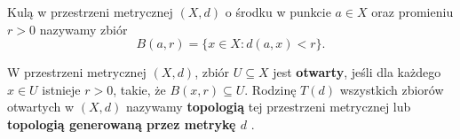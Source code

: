 \begin{definition}[Kula]
	Kulą w przestrzeni metrycznej $\left( X,d \right) $ o środku w punkcie $a\in X$ oraz promieniu $r > 0$ nazywamy zbiór
	\[
	B\left( a,r \right) = \{x \in X : d\left( a,x \right) < r\} 
	.\] 
\end{definition} 
\begin{definition}
	W przestrzeni metrycznej $\left( X,d \right) $, zbiór $U \subseteq X$ jest \textbf{otwarty}, jeśli dla każdego $x \in U$ istnieje $r>0$, takie, że $B\left( x,r \right) \subseteq U$. Rodzinę $T\left( d \right) $ wszystkich zbiorów otwartych w $\left( X, d \right) $ nazywamy \textbf{topologią} tej przestrzeni metrycznej lub \textbf{topologią generowaną przez metrykę $d$} .
\end{definition} 

